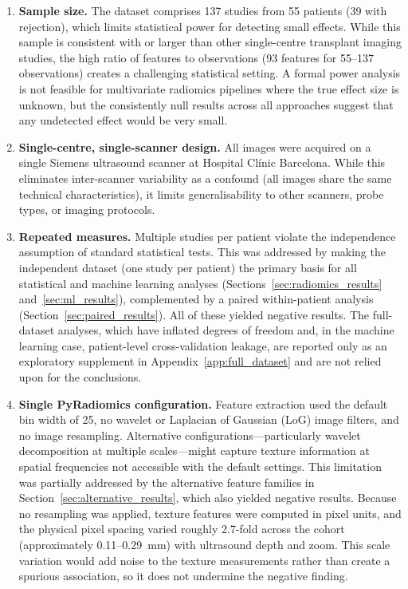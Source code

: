 \begin{enumerate}

\item \textbf{Sample size.} The dataset comprises 137 studies from 55 patients (39 with rejection), which limits statistical power for detecting small effects. While this sample is consistent with or larger than other single-centre transplant imaging studies, the high ratio of features to observations (93 features for 55--137 observations) creates a challenging statistical setting. A formal power analysis is not feasible for multivariate radiomics pipelines where the true effect size is unknown, but the consistently null results across all approaches suggest that any undetected effect would be very small.

\item \textbf{Single-centre, single-scanner design.} All images were acquired on a single Siemens ultrasound scanner at Hospital Cl\'{i}nic Barcelona. While this eliminates inter-scanner variability as a confound (all images share the same technical characteristics), it limits generalisability to other scanners, probe types, or imaging protocols.

\item \textbf{Repeated measures.} Multiple studies per patient violate the independence assumption of standard statistical tests. This was addressed by making the independent dataset (one study per patient) the primary basis for all statistical and machine learning analyses (Sections~\ref{sec:radiomics_results} and~\ref{sec:ml_results}), complemented by a paired within-patient analysis (Section~\ref{sec:paired_results}). All of these yielded negative results. The full-dataset analyses, which have inflated degrees of freedom and, in the machine learning case, patient-level cross-validation leakage, are reported only as an exploratory supplement in Appendix~\ref{app:full_dataset} and are not relied upon for the conclusions.

\item \textbf{Single PyRadiomics configuration.} Feature extraction used the default bin width of 25, no wavelet or Laplacian of Gaussian (LoG) image filters, and no image resampling. Alternative configurations---particularly wavelet decomposition at multiple scales---might capture texture information at spatial frequencies not accessible with the default settings. This limitation was partially addressed by the alternative feature families in Section~\ref{sec:alternative_results}, which also yielded negative results. Because no resampling was applied, texture features were computed in pixel units, and the physical pixel spacing varied roughly 2.7-fold across the cohort (approximately 0.11--0.29~mm) with ultrasound depth and zoom. This scale variation would add noise to the texture measurements rather than create a spurious association, so it does not undermine the negative finding.


\end{enumerate}
